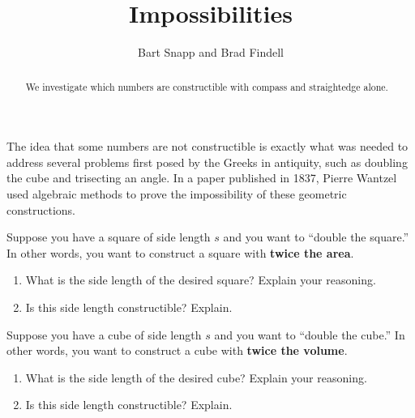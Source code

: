 \documentclass[nooutcomes]{ximera}
\title{Impossibilities}
\author{Bart Snapp and Brad Findell}
\begin{document}
\begin{abstract}
  We investigate which numbers are constructible with compass and
  straightedge alone.
\end{abstract}
\maketitle

The idea that some numbers are not constructible is exactly what was
needed to address several problems first posed by the Greeks in
antiquity, such as doubling the cube and trisecting an angle.  In a
paper published in 1837, Pierre Wantzel used algebraic methods to
prove the impossibility of these geometric constructions.

\begin{problem}
Suppose you have a square of side length $s$ and you want to ``double the square.''  In other words, you want to construct a square with \textbf{twice the area}.  
\begin{enumerate}
\item What is the side length of the desired square?  Explain your reasoning. 
\item Is this side length constructible?  Explain.  
\end{enumerate}
\vfill
\end{problem}

\begin{problem}
Suppose you have a cube of side length $s$ and you want to ``double the cube.''  In other words, you want to construct a cube with \textbf{twice the volume}.  
\begin{enumerate}
\item What is the side length of the desired cube?  Explain your reasoning. 
\item Is this side length constructible?  Explain.  
\end{enumerate}
\vfill
\end{problem}

\newpage
\end{document}
